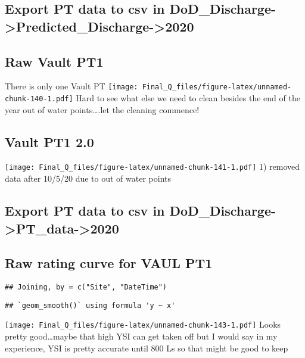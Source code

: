 \documentclass[
]{article}
\begin{document}
\hypertarget{export-pt-data-to-csv-in-dod_discharge-predicted_discharge-2020-2}{%
\subsection{Export PT data to csv in
DoD\_Discharge-\textgreater Predicted\_Discharge-\textgreater2020}\label{export-pt-data-to-csv-in-dod_discharge-predicted_discharge-2020-2}}

\hypertarget{raw-vault-pt1-1}{%
\subsection{Raw Vault PT1}\label{raw-vault-pt1-1}}

There is only one Vault PT
\texttt{[image: Final\_Q\_files/figure-latex/unnamed-chunk-140-1.pdf]}
Hard to see what else we need to clean besides the end of the year out
of water points\ldots.let the cleaning commence!

\hypertarget{vault-pt1-2.0}{%
\subsection{Vault PT1 2.0}\label{vault-pt1-2.0}}

\texttt{[image: Final\_Q\_files/figure-latex/unnamed-chunk-141-1.pdf]} 1)
removed data after 10/5/20 due to out of water points

\hypertarget{export-pt-data-to-csv-in-dod_discharge-pt_data-2020-3}{%
\subsection{Export PT data to csv in
DoD\_Discharge-\textgreater PT\_data-\textgreater2020}\label{export-pt-data-to-csv-in-dod_discharge-pt_data-2020-3}}

\hypertarget{raw-rating-curve-for-vaul-pt1}{%
\subsection{Raw rating curve for VAUL
PT1}\label{raw-rating-curve-for-vaul-pt1}}

\begin{verbatim}
## Joining, by = c("Site", "DateTime")
\end{verbatim}

\begin{verbatim}
## `geom_smooth()` using formula 'y ~ x'
\end{verbatim}

\texttt{[image: Final\_Q\_files/figure-latex/unnamed-chunk-143-1.pdf]}
Looks pretty good\ldots maybe that high YSI can get taken off but I
would say in my experience, YSI is pretty accurate until 800 Ls so that
might be good to keep
\end{document}
